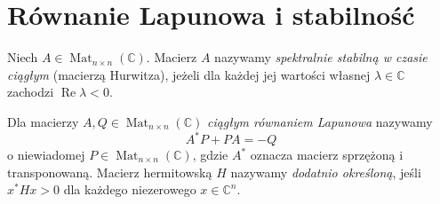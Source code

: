 \section{Równanie Lapunowa i stabilność}
\label{sec:lin22-lyapunov}

\begin{definicja}
\label{def:lin22-hurwitz}
Niech \(A\in\operatorname{Mat}_{n\times n}(\mathbb C)\).
Macierz \(A\) nazywamy
\emph{spektralnie stabilną w czasie ciągłym}
(macierzą Hurwitza), jeżeli
dla każdej jej wartości własnej
\(\lambda\in\mathbb C\) zachodzi
\(\operatorname{Re}\lambda<0\).
\end{definicja}

\begin{definicja}
\label{def:lin22-lyapunov}
Dla macierzy
\(A,Q\in\operatorname{Mat}_{n\times n}(\mathbb C)\)
\emph{ciągłym równaniem Lapunowa}
nazywamy
\[
 A^*P+PA=-Q
\]
o niewiadomej
\(P\in\operatorname{Mat}_{n\times n}(\mathbb C)\),
gdzie \(A^*\) oznacza macierz
sprzężoną i transponowaną.
Macierz hermitowską \(H\)
nazywamy \emph{dodatnio określoną},
jeśli \(x^*Hx>0\)
dla każdego niezerowego
\(x\in\mathbb C^n\).
\end{definicja}


